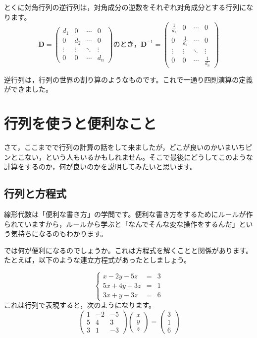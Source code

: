 \documentclass{ltjsbook}
\begin{document}
とくに対角行列の逆行列は，対角成分の逆数をそれぞれ対角成分とする行列になります。
\begin{equation*}
	\bm{D} = \begin{pmatrix} d_1    & 0      & \cdots & 0      \\
                0      & d_2    & \cdots & 0      \\
                \vdots & \vdots & \ddots & \vdots \\
                0      & 0      & \cdots & d_n\end{pmatrix}
	\mbox{のとき，}
	\bm{D}^{-1} = \begin{pmatrix} \frac{1}{d_1} & 0             & \cdots & 0             \\
                0             & \frac{1}{d_2} & \cdots & 0             \\
                \vdots        & \vdots        & \ddots & \vdots        \\
                0             & 0             & \cdots & \frac{1}{d_n}\end{pmatrix}
\end{equation*}

逆行列は，行列の世界の割り算のようなものです。これで一通り四則演算の定義ができました。

\section{行列を使うと便利なこと}
\label{MatrixAndEauqtion}
さて，ここまでで行列の計算の話をして来ましたが，どこが良いのかいまいちピンとこない，という人もいるかもしれません。そこで最後にどうしてこのような計算をするのか，何が良いのかを説明してみたいと思います。
\subsection{行列と方程式}
線形代数は「便利な書き方」の学問です。便利な書き方をするためにルールが作られていますから，ルールから学ぶと「なんでそんな変な操作をするんだ」という気持ちになるのもわかります。

では何が便利になるのでしょうか。これは方程式を解くことと関係があります。
たとえば，以下のような連立方程式があったとしましょう。

\[
	\left \{
	\begin{array}{lcl}
		x-2y-5z  & = & 3 \\
		5x+4y+3z & = & 1 \\
		3x+y-3z  & = & 6
	\end{array}
	\right .
\]
これは行列で表現すると，次のようになります。
\[
	\begin{pmatrix} 1 & -2 & -5 \\
                5 & 4  & 3  \\
                3 & 1  & -3\end{pmatrix}
	\begin{pmatrix} x \\ y \\ z \end{pmatrix}
	=
	\begin{pmatrix} 3 \\ 1 \\ 6 \end{pmatrix}
\]
\end{document}
